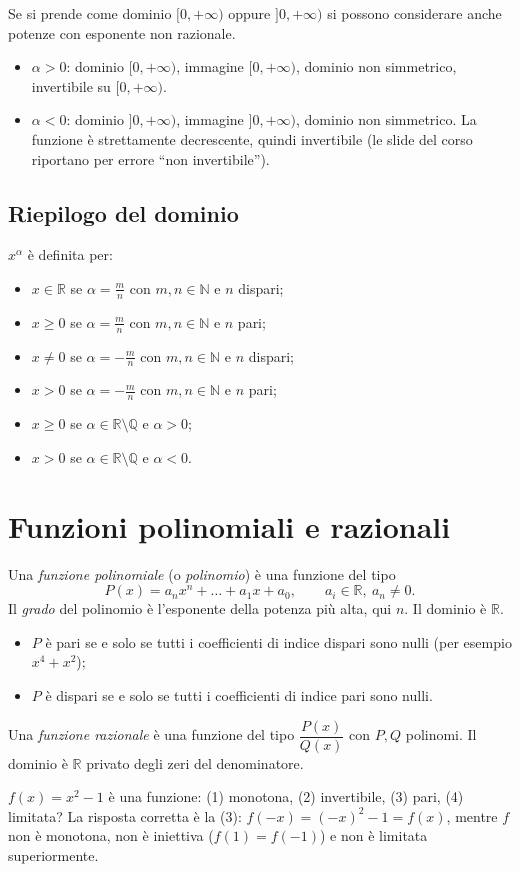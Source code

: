 \documentclass[11pt,a4paper]{article}
\begin{document}
Se si prende come dominio $[0,+\infty)$ oppure $]0,+\infty)$ si possono considerare anche potenze con esponente non razionale.
\begin{itemize}
    \item $\alpha > 0$: dominio $[0,+\infty)$, immagine $[0,+\infty)$, dominio non simmetrico, invertibile su $[0,+\infty)$.
    \item $\alpha < 0$: dominio $]0,+\infty)$, immagine $]0,+\infty)$, dominio non simmetrico. La funzione è strettamente decrescente, quindi invertibile (le slide del corso riportano per errore ``non invertibile'').
\end{itemize}

\subsection*{Riepilogo del dominio}

$x^\alpha$ è definita per:
\begin{itemize}
    \item $x \in \mathbb{R}$ se $\alpha = \frac{m}{n}$ con $m, n \in \mathbb{N}$ e $n$ dispari;
    \item $x \ge 0$ se $\alpha = \frac{m}{n}$ con $m, n \in \mathbb{N}$ e $n$ pari;
    \item $x \ne 0$ se $\alpha = -\frac{m}{n}$ con $m, n \in \mathbb{N}$ e $n$ dispari;
    \item $x > 0$ se $\alpha = -\frac{m}{n}$ con $m, n \in \mathbb{N}$ e $n$ pari;
    \item $x \ge 0$ se $\alpha \in \mathbb{R} \setminus \mathbb{Q}$ e $\alpha > 0$;
    \item $x > 0$ se $\alpha \in \mathbb{R} \setminus \mathbb{Q}$ e $\alpha < 0$.
\end{itemize}

\section{Funzioni polinomiali e razionali}

Una \emph{funzione polinomiale} (o \emph{polinomio}) è una funzione del tipo
\[
P(x) = a_n x^n + \dots + a_1 x + a_0, \qquad a_i \in \mathbb{R},\ a_n \ne 0.
\]
Il \emph{grado} del polinomio è l'esponente della potenza più alta, qui $n$. Il dominio è $\mathbb{R}$.
\begin{itemize}
    \item $P$ è pari se e solo se tutti i coefficienti di indice dispari sono nulli (per esempio $x^4 + x^2$);
    \item $P$ è dispari se e solo se tutti i coefficienti di indice pari sono nulli.
\end{itemize}

Una \emph{funzione razionale} è una funzione del tipo $\dfrac{P(x)}{Q(x)}$ con $P, Q$ polinomi. Il dominio è $\mathbb{R}$ privato degli zeri del denominatore.

\begin{esempio}[Test]
$f(x) = x^2 - 1$ è una funzione: (1) monotona, (2) invertibile, (3) pari, (4) limitata? La risposta corretta è la (3): $f(-x) = (-x)^2 - 1 = f(x)$, mentre $f$ non è monotona, non è iniettiva ($f(1) = f(-1)$) e non è limitata superiormente.
\end{esempio}
\end{document}
